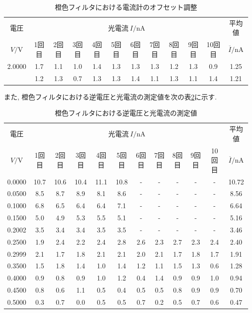 \documentclass{jarticle}
\begin{document}
\begin{table}[H]
  \caption{橙色フィルタにおける電流計のオフセット調整}
  \label{tb:orange-filter-offset}
  \hspace{-2.5cm}
  \begin{tabular}{cccccccccccc}
    \hline
    電圧 & \multicolumn{10}{c}{光電流$\ I/\mathrm{nA}$} & 平均値 \\
    $V/\mathrm{V}$ & 1回目 & 2回目 & 3回目 & 4回目 & 5回目 & 6回目 & 7回目 & 8回目 & 9回目 & 10回目 & $\overline{I}/\mathrm{nA}$ \\
    \hline
    2.0000 & 1.7 & 1.1 & 1.0 & 1.4 & 1.3 & 1.3 & 1.3 & 1.2 & 1.3 & 0.9 & 1.25 \\
    & 1.2 & 1.3 & 0.7 & 1.3 & 1.3 & 1.4 & 1.1 & 1.3 & 1.1 & 1.4 & 1.21 \\
    \hline
  \end{tabular}
\end{table}

また, 橙色フィルタにおける逆電圧と光電流の測定値を次の表\ref{tb:orange-filter}に示す.

\begin{table}[H]
  \caption{橙色フィルタにおける逆電圧と光電流の測定値}
  \label{tb:orange-filter}
  \hspace{-2.5cm}
  \begin{tabular}{cccccccccccc}
    \hline
    電圧 & \multicolumn{10}{c}{光電流$\ I/\mathrm{nA}$} & 平均値 \\
    $V/\mathrm{V}$ & 1回目 & 2回目 & 3回目 & 4回目 & 5回目 & 6回目 & 7回目 & 8回目 & 9回目 & 10回目 & $\overline{I}/\mathrm{nA}$ \\
    \hline
    0.0000 & 10.7 & 10.6 & 10.4 & 11.1 & 10.8 & - & - & - & - & - & 10.72 \\
    0.0500 & 8.5 & 8.7 & 8.9 & 8.1 & 8.6 & - & - & - & - & - & 8.56 \\
    0.1000 & 6.8 & 6.5 & 6.4 & 6.4 & 7.1 & - & - & - & - & - & 6.64 \\
    0.1500 & 5.0 & 4.9 & 5.3 & 5.5 & 5.1 & - & - & - & - & - & 5.16 \\
    0.2002 & 3.5 & 3.4 & 3.4 & 3.5 & 3.5 & - & - & - & - & - & 3.46 \\
    0.2500 & 1.9 & 2.4 & 2.2 & 2.4 & 2.8 & 2.6 & 2.3 & 2.7 & 2.3 & 2.4 & 2.40 \\
    0.2999 & 2.1 & 1.7 & 1.8 & 2.1 & 2.1 & 2.0 & 2.1 & 1.7 & 1.8 & 1.7 & 1.91 \\
    0.3500 & 1.5 & 1.8 & 1.4 & 1.0 & 1.4 & 1.2 & 1.1 & 1.5 & 1.3 & 0.6 & 1.28 \\
    0.4000 & 0.9 & 0.8 & 0.9 & 1.0 & 1.2 & 0.4 & 1.4 & 0.9 & 0.9 & 1.0 & 0.94 \\
    0.4500 & 0.8 & 0.6 & 1.1 & 0.5 & 0.4 & 0.5 & 0.5 & 0.8 & 0.9 & 0.9 & 0.70 \\
    0.5000 & 0.3 & 0.7 & 0.0 & 0.5 & 0.5 & 0.7 & 0.2 & 0.5 & 0.7 & 0.6 & 0.47 \\
    \hline
  \end{tabular}
\end{table}
\end{document}
